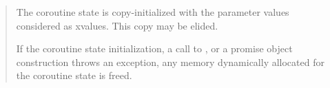 \begin{quote}
\pnum
The coroutine state is copy-initialized with the parameter values considered as xvalues. 
This copy may be elided.




\pnum
If the coroutine state initialization, a call to , or a promise object construction throws
an exception, 
any memory dynamically allocated 
for the coroutine state is freed.



%

\end{quote}